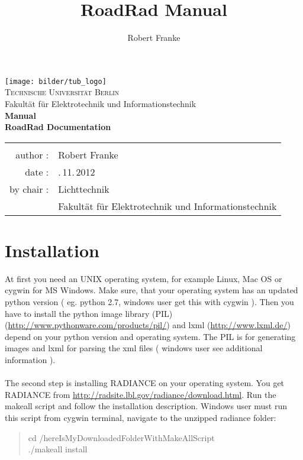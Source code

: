 \documentclass[10pt,a4paper]{report}
\author{Robert Franke}
\title{RoadRad Manual}
\begin{document}
\begin{titlepage}
\centering
\texttt{[image: bilder/tub\_logo]}\\[3ex]
{\Large \textsc{Technische Universität Berlin}}\\[3ex]
{\Large Fakultät für Elektrotechnik und Informationstechnik}\\[3ex]
\vfill
{\Large \textbf{Manual}}\\[4ex]
{\large \textbf{RoadRad Documentation}}\\[5ex]
\vfill
\begin{tabular}{rl}
\hline\\
author :          		& \quad Robert Franke \\[1,5ex]

date :         			& \quad 26.\,11.\,2012\\[1,5ex]

by chair :				& \quad Lichttechnik\\[1,5ex]
                        & \quad Fakultät für Elektrotechnik und Informationstechnik\\[1,5ex]

\end{tabular}
\vfill
\end{titlepage}

\newpage\thispagestyle{empty}
\tableofcontents %
\newpage
\setcounter{page}{1}

\chapter{Installation}
At first you need an UNIX operating system, for example Linux, Mac OS or cygwin  for MS Windows. Make sure, that your operating system has an updated python version ( eg. python 2.7, windows user get this with cygwin ). Then you have to install the python image library (PIL) (\url{http://www.pythonware.com/products/pil/}) and lxml (\url{http://www.lxml.de/}) depend on your python version and operating system. The PIL is for generating images and lxml for parsing the xml files ( windows user see additional information ).\\
\\
The second step is installing RADIANCE on your operating system. You get RADIANCE from \url{http://radsite.lbl.gov/radiance/download.html}. Run the makeall script and follow the installation description. Windows user must run this script from cygwin terminal, navigate to the unzipped radiance folder:
\begin{quote}
cd /hereIsMyDownloadedFolderWithMakeAllScript \\
./makeall install
\end{quote}
\end{document}
